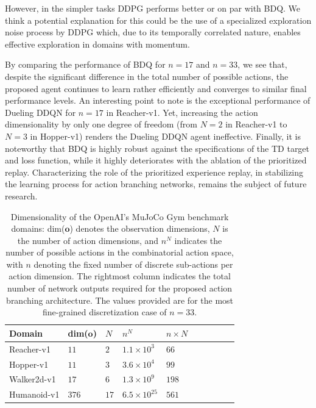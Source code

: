 \documentclass[letterpaper]{article} %
\begin{document}
However, in the simpler tasks DDPG performs better or on par with BDQ. We think a potential explanation for this could be the use of a specialized exploration noise process by DDPG which, due to its temporally correlated nature, enables effective exploration in domains with momentum.

By comparing the performance of BDQ for $n=17$ and $n=33$, we see that, despite the significant difference in the total number of possible actions, the proposed agent continues to learn rather efficiently and converges to similar final performance levels. An interesting point to note is the exceptional performance of Dueling DDQN for $n=17$ in Reacher-v1. Yet, increasing the action dimensionality by only one degree of freedom (from $N=2$ in Reacher-v1 to $N=3$ in Hopper-v1) renders the Dueling DDQN agent ineffective.
Finally, it is noteworthy that BDQ is highly robust against the specifications of the TD target and loss function, while it highly deteriorates with the ablation of the prioritized replay. Characterizing the role of the prioritized experience replay, in stabilizing the learning process for action branching networks, remains the subject of future research.

\begin{table}[t!]
\begin{center}
\begin{tabular}{llllllllll}
\toprule
Domain  & dim($\boldsymbol{o}$) & $N$ & $n^N$ & $n \times N$ \\
\midrule
Reacher-v1 & $11$ & $2$ & $1.1 \times 10^{3}$ & $66$ \\
Hopper-v1  & $11$ & $3$ & $3.6 \times 10^{4}$ & $99$ \\
Walker2d-v1 & $17$ & $6$ & $1.3 \times 10^{9}$ & $198$ \\
Humanoid-v1 & $376$ & $17$ & $6.5 \times 10^{25}$ & $561$ \\
\bottomrule
\end{tabular}
\end{center}
\caption{Dimensionality of the OpenAI's MuJoCo Gym benchmark domains: dim($\boldsymbol{o}$) denotes the observation dimensions, $N$ is the number of action dimensions, and $n^N$ indicates the number of possible actions in the combinatorial action space, with $n$ denoting the fixed number of discrete sub-actions per action dimension. The rightmost column indicates the total number of network outputs required for the proposed action branching architecture. The values provided are for the most fine-grained discretization case of $n=33$.}
\label{table:dim_specs_OpenAI_benchmarks}
\end{table}
\end{document}
